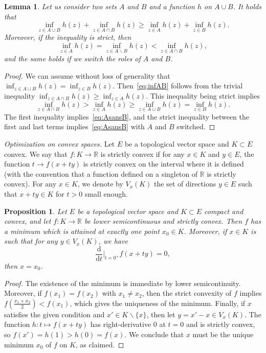 \documentclass[a4paper,11pt]{amsart}
\newcommand{\R}{\mathbb R}
\newtheorem{prop}[thm]{Proposition}
\newtheorem{lem}[thm]{Lemma}
\theoremstyle{definition}
\begin{document}
\begin{lem}\label{lem:inf}
Let us consider two sets $A$ and $B$ and a function $h$ on $A \cup B$.
It holds that
\begin{equation}\label{eq:infAB}
\inf_{z \in A \cup B} h(z) +\inf_{z \in A \cap B} h(z)
\ge \inf_{z \in A} h(z) + \inf_{z \in B} h(z).
\end{equation}
Moreover, if the inequality is strict, then
\begin{equation}\label{eq:AsansB}
    \inf_{z \in A} h(z) = \inf_{z \in A \backslash B} h(z) < \inf_{z \in A \cap B} h(z),
\end{equation}
and the same holds if we switch the roles of $A$ and $B$.
\end{lem}
\begin{proof}
We can assume without loss of generality
that $\inf_{z \in A \cup B} h(z) =\inf_{z \in B} h(z)$.
Then~\eqref{eq:infAB} follows from the trivial inequality
$\inf_{z \in A \cap B} h(z) \ge \inf_{z \in A} h(z)$. This inequality being strict implies 
\[ \inf_{z \in A \cap B} h(z) > \inf_{z \in A} h(z) \geq \inf_{z \in A \cup B} h(z) = \inf_{z \in B} h(z). \]
The first inequality implies~\eqref{eq:AsansB}, and the strict inequality between the first and last terms implies~\eqref{eq:AsansB} with $A$ and $B$ switched.
\end{proof}

\textit{Optimization on convex spaces.}
Let $E$ be a topological vector space and $K \subset E$ convex.
We say that $f:K \to \R$ is strictly convex if for any $x \in K$ and $y \in E$, the function $t \to f(x+ty)$ is strictly convex on the interval where it is defined
(with the convention that a function defined on a singleton of $\R$ is strictly convex).
For any $x \in K$, we denote by $V_x(K)$ the set of directions $y \in E$ such that $x+ty \in K$ for $t>0$ small enough.

\begin{prop}\label{prop:max_concave}
    Let $E$ be a topological vector space and $K \subset E$ compact and convex, and let $f:K \to \mathbb{R}$ be lower semicontinuous and strictly convex.
    Then $f$ has a minimum which is attained at exactly one point $x_0 \in K$.
    Moreover, if $x \in K$ is such that for any $y \in V_x(K)$, we have
    \[ \frac{\mathrm{d}}{\mathrm{d}t}\Big|_{t=0^+} f(x+ty)=0 ,\]
    then $x=x_0$.
\end{prop}

\begin{proof}
    The existence of the minimum is immediate by lower semicontinuity.
    Moreover, if $f(x_1)=f(x_2)$ with $x_1 \ne x_2$, then the strict convexity of $f$ implies $f \left( \frac{x_1+x_2}{2}\right) <f(x_1)$, which gives the uniqueness of the minimum.
    Finally, if $x$ satisfies the given condition and $x' \in K \backslash\{x\}$, then let $y=x'-x \in V_x(K)$. The function $h:t \mapsto f(x+ty)$ has right-derivative $0$ at $t=0$ and is strictly convex, so $f(x')=h(1)>h(0)=f(x)$.
    We conclude that $x$ must be the unique minimum $x_0$ of $f$ on $K$, as claimed.
\end{proof}
\end{document}
